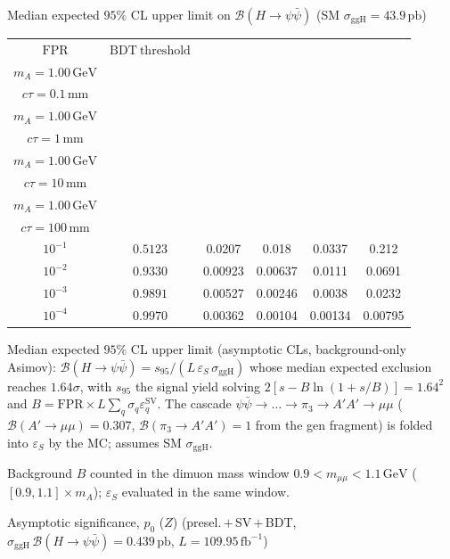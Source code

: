 \documentclass[10pt,a4paper]{article}
\begin{document}
{\vspace{12pt}

Median expected $95\%$ CL upper limit on $\mathcal{B}(H\to\psi\bar{\psi})$ (SM $\sigma_{\mathrm{ggH}}=43.9\,\mathrm{pb}$)

\begin{tabular}{cccccc}
\toprule
$\mathrm{FPR}$ & $\mathrm{BDT\ threshold}$ & \shortstack{$m_{\pi}=10\,\mathrm{GeV}$\\$m_{A}=1.00\,\mathrm{GeV}$\\$c\tau=0.1\,\mathrm{mm}$} & \shortstack{$m_{\pi}=10\,\mathrm{GeV}$\\$m_{A}=1.00\,\mathrm{GeV}$\\$c\tau=1\,\mathrm{mm}$} & \shortstack{$m_{\pi}=10\,\mathrm{GeV}$\\$m_{A}=1.00\,\mathrm{GeV}$\\$c\tau=10\,\mathrm{mm}$} & \shortstack{$m_{\pi}=10\,\mathrm{GeV}$\\$m_{A}=1.00\,\mathrm{GeV}$\\$c\tau=100\,\mathrm{mm}$} \\
\midrule
$10^{-1}$ & $0.5123$ & 0.0207 & 0.018 & 0.0337 & 0.212\\
$10^{-2}$ & $0.9330$ & 0.00923 & 0.00637 & 0.0111 & 0.0691\\
$10^{-3}$ & $0.9891$ & 0.00527 & 0.00246 & 0.0038 & 0.0232\\
$10^{-4}$ & $0.9970$ & 0.00362 & 0.00104 & 0.00134 & 0.00795\\
\bottomrule
\end{tabular}

{\small Median expected $95\%$ CL upper limit (asymptotic CLs, background-only Asimov): $\mathcal{B}(H\to\psi\bar{\psi})=s_{95}/(L\,\varepsilon_S\,\sigma_{\mathrm{ggH}})$ whose median expected exclusion reaches $1.64\sigma$, with $s_{95}$ the signal yield solving $2[s-B\ln(1{+}s/B)]=1.64^2$ and $B=\mathrm{FPR}\times L\sum_q\sigma_q\varepsilon_q^{\mathrm{SV}}$. The cascade $\psi\bar{\psi}\to\ldots\to\pi_3\to A'A'\to\mu\mu$ ($\mathcal{B}(A'\to\mu\mu)=0.307$, $\mathcal{B}(\pi_3\to A'A')=1$ from the gen fragment) is folded into $\varepsilon_S$ by the MC; assumes SM $\sigma_{\mathrm{ggH}}$.}

{\small Background $B$ counted in the dimuon mass window $0.9<m_{\mu\mu}<1.1\,\mathrm{GeV}$ ($[0.9,1.1]\times m_A$); $\varepsilon_S$ evaluated in the same window.}

\vspace{12pt}

Asymptotic significance, $p_0$ ($Z$) (presel.\,$+$\,SV\,$+$\,BDT, $\sigma_{\mathrm{ggH}}\,\mathcal{B}(H\to\psi\bar{\psi})=0.439\,\mathrm{pb}$, $L=109.95\,\mathrm{fb}^{-1}$)

}
\end{document}
